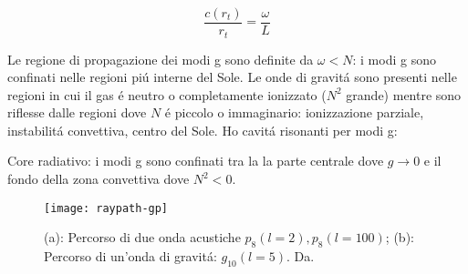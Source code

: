 \documentclass[../main.tex]{subfiles}
\begin{document}

\begin{equation}
\frac{c(r_t)}{r_t}=\frac{\omega}{L}
\end{equation}

Le regione di propagazione dei modi g sono definite da $\omega<N$: i modi g sono confinati nelle regioni pi\'u interne del Sole.
Le onde di gravit\'a sono presenti nelle regioni in cui il gas \'e neutro o completamente ionizzato ($N^2$ grande) mentre sono riflesse dalle regioni dove $N$ \'e piccolo o immaginario: ionizzazione parziale, instabilit\'a convettiva, centro del Sole.
Ho cavit\'a risonanti per modi g:

Core radiativo: i modi g sono confinati tra la la parte centrale dove $g\to0$ e il fondo della zona convettiva dove $N^2<0$.

\begin{figure}[!ht]
\texttt{[image: raypath-gp]}
\caption{(a): Percorso di due onda acustiche $p_8(l=2), p_8(l=100)$; (b): Percorso di un'onda di gravit\'a: $g_{10}(l=5)$. Da\cite{gou91seismic}.}
\end{figure}

\end{document}
